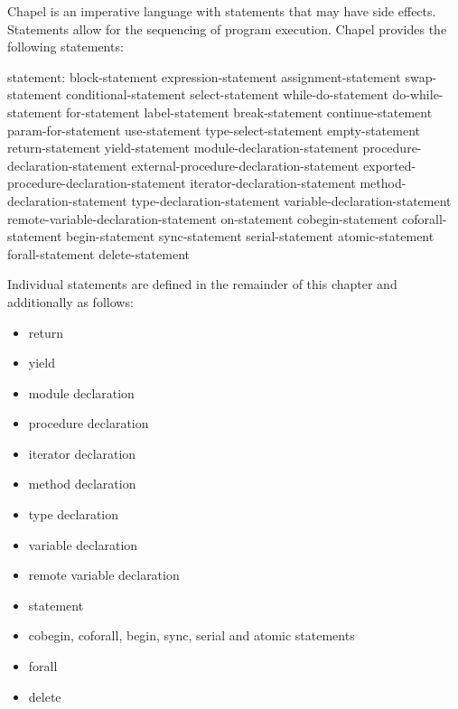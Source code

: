 \label{Statements}

Chapel is an imperative language with statements that may have side
effects.  Statements allow for the sequencing of program execution.
Chapel provides the following statements:

\begin{syntax}
statement:
  block-statement
  expression-statement
  assignment-statement
  swap-statement
  conditional-statement
  select-statement
  while-do-statement
  do-while-statement
  for-statement
  label-statement
  break-statement
  continue-statement
  param-for-statement
  use-statement
  type-select-statement
  empty-statement
  return-statement
  yield-statement
  module-declaration-statement
  procedure-declaration-statement
  external-procedure-declaration-statement
  exported-procedure-declaration-statement
  iterator-declaration-statement
  method-declaration-statement
  type-declaration-statement
  variable-declaration-statement
  remote-variable-declaration-statement
  on-statement
  cobegin-statement
  coforall-statement
  begin-statement
  sync-statement
  serial-statement
  atomic-statement
  forall-statement
  delete-statement
\end{syntax}

Individual statements are defined in the remainder of this chapter
and additionally as follows:

\begin{itemize}
\item return 
\item yield 
\item module declaration 
\item procedure declaration 
\item iterator declaration 
\item method declaration 
\item type declaration 
\item variable declaration 
\item remote variable declaration ~
\item {} statement 
\item cobegin, coforall, begin, sync, serial and atomic statements
\item forall 
\item delete 
\end{itemize}


